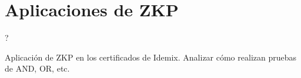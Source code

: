 \chapter{Aplicaciones de ZKP}\label{ch:aplicaciones} 

?

Aplicación de ZKP en los certificados de Idemix. Analizar cómo realizan pruebas de AND, OR, etc.